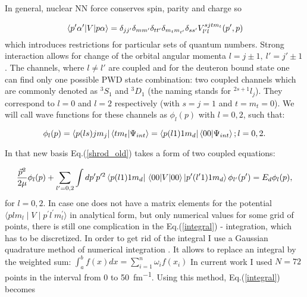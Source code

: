     In general, nuclear NN force conserves spin, parity and charge so

    \begin{equation}
        \matrixel*{p^\prime\alpha^\prime}{V}{p\alpha} = \delta_{jj'}\delta_{mm'}\delta_{tt'}\delta_{m_tm_{t'}}
        \delta_{ss'}V^{sjtm_t}_{l'l}(p',p)
        \label{conservation}
    \end{equation}
    which introduces restrictions for particular sets of quantum numbers.
    Strong interaction allows for change of the orbital angular momenta $l = j \pm 1,~l'=j'\pm1$.
    The channels, where $l \neq l'$
    are coupled and for the deuteron bound state 
    one can find only one possible PWD state combination:
    two coupled channels 
    which are commonly denoted as $^3S_1$ and $^3D_1$ (the naming stands for $^{2s+1}l_j$). They correspond 
    to $l=0$ and $l=2$ respectively (with $s = j = 1$ and $t = m_t = 0$). 
    We will call wave functions for these channels as $\phi_l(p)$ with $l=0,2$, such that:

    
    \begin{equation}
        \phi_l(p) = \bra{p (ls) j m_j}\braket{t m_t}{\Psi_{int}} = \bra{p(l1)1m_d} \braket{00}{\Psi_{int}}; l=0,2.
        \label{deut_waves}
    \end{equation}

    In that new basis Eq.(\ref{shrod_old}) takes a form of two coupled equations:

    \begin{equation}
        \frac{\vec{p}^2}{2\mu} \phi_l(p) +
        \sum_{l^\prime =0,2} \int d p^\prime p^{\prime 2} 
        \bra{p(l1)1m_d} \matrixel{00}{V}{00} \ket{p^\prime(l^\prime1)1m_d}
        \phi_{l^\prime}(p^\prime) = 
        E_d \phi_l(p),
        \label{integral}
    \end{equation}
    for $l=0,2$. In case one does not have a matrix elements for the potential 
    $\langle plm_l \mid V \mid p^\prime l^\prime m_l^\prime  \rangle$ in analytical form,
    but only numerical values for some grid of points, 
    there is still one complication in the Eq.(\ref{integral}) - integration, which has to be discretized.
    In order to get rid of the integral I use a Gaussian quadrature 
    method of numerical integration \cite{jacobi1826ueber}.
    It allows to replace an integral by the weighted sum:
        $\int_a^b f(x)dx = \sum_{i=1}^n \omega_i f(x_i)$
    In current work I used $N=72$ points in the interval from $0$ to \SI{50}{fm^{-1}}. 
    Using this method, Eq.(\ref{integral}) becomes  

